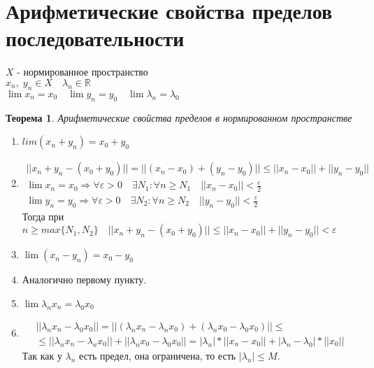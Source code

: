 \documentclass[12pt,letterpaper]{report}
\makeatletter
\newtheorem{theorem}{Теорема}
\renewenvironment{proof}[1][\proofname]{%
   \par\pushQED{\qed}\normalfont%
   \topsep6\p@\@plus6\p@\relax
   \trivlist\item[\hskip\labelsep\bfseries#1\@addpunct{.}]%
   \ignorespaces
}{%
   \popQED\endtrivlist\@endpefalse
}
\makeatother
\begin{document}
\section{Арифметические свойства пределов последовательности}
$X$ - нормированное пространство \\
$x_n,\; y_n \in X \quad \lambda_n \in \mathbb{R}$ \\
$\lim x_n = x_0 \quad \lim y_n = y_0 \quad \lim \lambda_n = \lambda_0$ 
\begin{theorem} Арифметические свойства пределов в нормированном пространстве \end{theorem}
\begin{enumerate}
    \item $lim (x_n + y_n) = x_0 + y_0$
    \begin{proof}
            \begin{gather*}
                ||x_n + y_n - (x_0 + y_0) || = || (x_n - x_0) + (y_n - y_0)|| \leqslant ||x_n - x_0|| + ||y_n - y_0|| \\
                \lim x_n = x_0 \Rightarrow \forall \varepsilon > 0 \quad \exists N_1 : \forall n \geqslant N_1 \quad ||x_n - x_0|| < \frac{\varepsilon}{2} \\
                \lim y_n = y_0 \Rightarrow \forall \varepsilon > 0 \quad \exists N_2 : \forall n \geqslant N_2 \quad ||y_n - y_0|| < \frac{\varepsilon}{2} 
            \end{gather*}
            Тогда при $n \geqslant max\{N_1, N_2\} \quad ||x_n + y_n - (x_0 + y_0)|| \leqslant ||x_n - x_0|| + ||y_n - y_0|| < \varepsilon$
    \end{proof}
    \item $\lim (x_n - y_n) = x_0 - y_0$
    \begin{proof}
            Аналогично первому пункту.
    \end{proof}
    \item $\lim \lambda_nx_n = \lambda_0x_0$
    \begin{proof}
            \begin{gather*}
            || \lambda_nx_n - \lambda_0x_0 || = ||(\lambda_nx_n - \lambda_nx_0) + (\lambda_nx_0 - \lambda_0x_0)|| \leqslant \\
            \leqslant ||\lambda_nx_n - \lambda_nx_0|| + ||\lambda_nx_0 - \lambda_0x_0|| = |\lambda_n|*||x_n - x_0|| + |\lambda_n - \lambda_0|*||x_0||
            \end{gather*} 
            Так как у $\lambda_n$ есть предел, она ограничена, то есть $|\lambda_n| \leqslant M$. \\

\end{proof}
\end{enumerate}
\end{document}
